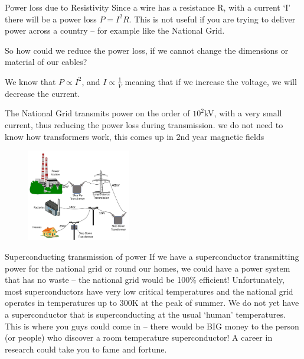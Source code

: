 \documentclass[../Main.tex]{subfiles}
\begin{document}
\begin{frame}{Power loss due to Resistivity}
    Since a wire has a resistance R, with a current `I' there will be a power loss $P=I^2R$. This is not useful if you are trying to deliver power across a country -- for example like the National Grid. 
    \pause
    \newline
    
    So how could we reduce the power loss, if we cannot change the dimensions or material of our cables? \pause
    \newline
    
    \begin{multicols}{2}
    We know that $P\propto I^2$, and $I\propto \frac{1}{V}$ meaning that if we increase the voltage, we will decrease the current. 

    The National Grid transmits power on the order of $10^2$kV, with a very small current, thus reducing the power loss during transmission.
    \newline \newline
    {\tiny *we do not need to know how transformers work, this comes up in 2nd year magnetic fields}
    \columnbreak
    \begin{figure}
        \centering
        \includegraphics[height=4cm]{Electricity_Images/national_grid.png}
    \end{figure}
\end{multicols}
\end{frame}

\begin{frame}{Superconducting transmission of power}
    If we have a superconductor transmitting power for the national grid or round our homes, we could have a power system that has no waste -- the national grid would be 100\% efficient!
    \pause
    \newline \newline
    Unfortunately, most superconductors have very low critical temperatures and the national grid operates in temperatures up to 300K at the peak of summer. We do not yet have a superconductor that is superconducting at the usual `human' temperatures. \newline \newline
    This is where you guys could come in -- there would be BIG money to the person (or people) who discover a room temperature superconductor! A career in research could take you to fame and fortune.
\end{frame}
\end{document}
